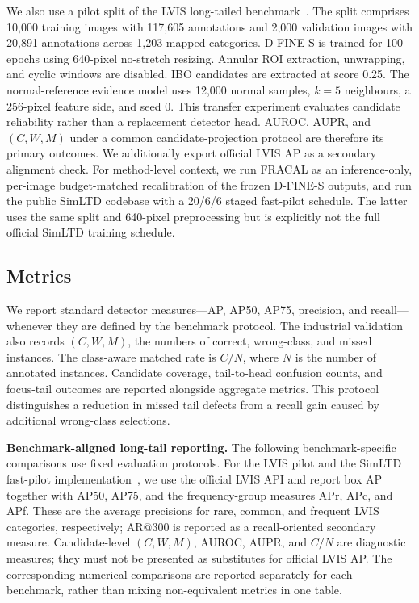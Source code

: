 We also use a pilot split of the LVIS long-tailed benchmark~\cite{gupta2019lvis}. The split comprises 10,000 training images with 117,605 annotations and 2,000 validation images with 20,891 annotations across 1,203 mapped categories. D-FINE-S is trained for 100 epochs using 640-pixel no-stretch resizing. Annular ROI extraction, unwrapping, and cyclic windows are disabled. IBO candidates are extracted at score 0.25. The normal-reference evidence model uses 12,000 normal samples, $k=5$ neighbours, a 256-pixel feature side, and seed 0. This transfer experiment evaluates candidate reliability rather than a replacement detector head. AUROC, AUPR, and $(C,W,M)$ under a common candidate-projection protocol are therefore its primary outcomes. We additionally export official LVIS AP as a secondary alignment check. For method-level context, we run FRACAL as an inference-only, per-image budget-matched recalibration of the frozen D-FINE-S outputs, and run the public SimLTD codebase with a 20/6/6 staged fast-pilot schedule. The latter uses the same split and 640-pixel preprocessing but is explicitly not the full official SimLTD training schedule.

\subsection{Metrics}

We report standard detector measures---AP, AP50, AP75, precision, and recall---whenever they are defined by the benchmark protocol. The industrial validation also records $(C,W,M)$, the numbers of correct, wrong-class, and missed instances. The class-aware matched rate is $C/N$, where $N$ is the number of annotated instances. Candidate coverage, tail-to-head confusion counts, and focus-tail outcomes are reported alongside aggregate metrics. This protocol distinguishes a reduction in missed tail defects from a recall gain caused by additional wrong-class selections.

\textbf{Benchmark-aligned long-tail reporting.} The following benchmark-specific comparisons use fixed evaluation protocols. For the LVIS pilot and the SimLTD fast-pilot implementation~\cite{tran2025simltd}, we use the official LVIS API and report box AP together with AP50, AP75, and the frequency-group measures APr, APc, and APf. These are the average precisions for rare, common, and frequent LVIS categories, respectively; AR@300 is reported as a recall-oriented secondary measure. Candidate-level $(C,W,M)$, AUROC, AUPR, and $C/N$ are diagnostic measures; they must not be presented as substitutes for official LVIS AP. The corresponding numerical comparisons are reported separately for each benchmark, rather than mixing non-equivalent metrics in one table.
